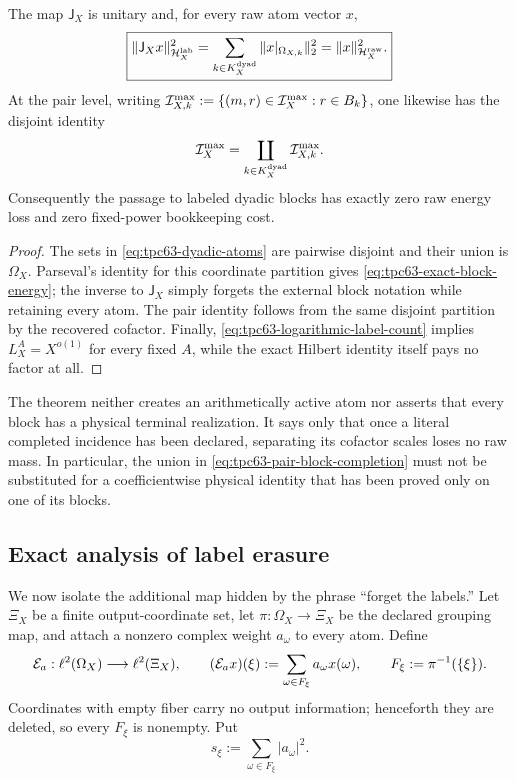\begin{theorem}
\label{thm:tpc63-exact-labelled-completion}
The map \(\mathsf J_X\) is unitary and, for every raw atom vector \(x\),
\begin{equation}
 \boxed{
 \|\mathsf J_Xx\|_{\mathcal H_X^{\rm lab}}^2
 =\sum_{k\in K_X^{\rm dyad}}
      \|x|_{\Omega_{X,k}}\|_2^2
 =\|x\|_{\mathcal H_X^{\rm raw}}^2.}
 \label{eq:tpc63-exact-block-energy}
\end{equation}
At the pair level, writing
\(
 \mathcal I_{X,k}^{\max}
 :=\{(m,r)\in\mathcal I_X^{\max}:r\in B_k\}
\), one likewise has the disjoint identity
\begin{equation}
 \mathcal I_X^{\max}
 =\coprod_{k\in K_X^{\rm dyad}}\mathcal I_{X,k}^{\max}.
 \label{eq:tpc63-pair-block-completion}
\end{equation}
Consequently the passage to labeled dyadic blocks has exactly zero raw
energy loss and zero fixed-power bookkeeping cost.
\end{theorem}

\begin{proof}
The sets in \eqref{eq:tpc63-dyadic-atoms} are pairwise disjoint and their
union is \(\Omega_X\).  Parseval's identity for this coordinate partition
gives \eqref{eq:tpc63-exact-block-energy}; the inverse to \(\mathsf J_X\) simply
forgets the external block notation while retaining every atom.  The pair
identity follows from the same disjoint partition by the recovered
cofactor.  Finally, \eqref{eq:tpc63-logarithmic-label-count} implies
\(L_X^A=X^{o(1)}\) for every fixed \(A\), while the exact Hilbert identity
itself pays no factor at all.
\end{proof}

The theorem neither creates an arithmetically active atom nor asserts that
every block has a physical terminal realization.  It says only that once a
literal completed incidence has been declared, separating its cofactor
scales loses no raw mass.  In particular, the union in
\eqref{eq:tpc63-pair-block-completion} must not be substituted for a
coefficientwise physical identity that has been proved only on one of its
blocks.

\subsection{Exact analysis of label erasure}

We now isolate the additional map hidden by the phrase ``forget the
labels.''  Let \(\Xi_X\) be a finite output-coordinate set, let
\(\pi:\Omega_X\to\Xi_X\) be the declared grouping map, and attach a
nonzero complex weight \(a_\omega\) to every atom.  Define
\begin{equation}
 \mathcal E_a:\ell^2(\Omega_X)\longrightarrow\ell^2(\Xi_X),
 \qquad
 (\mathcal E_ax)(\xi)
 :=\sum_{\omega\in F_\xi}a_\omega x(\omega),
 \qquad
 F_\xi:=\pi^{-1}(\{\xi\}).
 \label{eq:tpc63-weighted-erasure-map}
\end{equation}
Coordinates with empty fiber carry no output information; henceforth they
are deleted, so every \(F_\xi\) is nonempty.  Put
\begin{equation}
 s_\xi:=\sum_{\omega\in F_\xi}|a_\omega|^2.
 \label{eq:tpc63-fiber-square-mass}
\end{equation}

